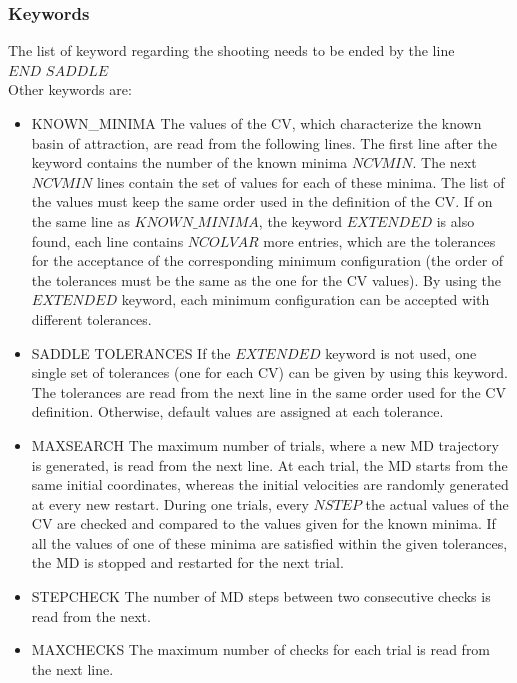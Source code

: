 \documentclass[twoside,10pt,titlepage,a4paper]{article}
\begin{document}
\subsubsection{Keywords}
The list of keyword regarding the shooting needs to be ended by the line \\
$END$ $SADDLE$ \\
Other keywords are:
\begin{itemize}
\item{KNOWN\_MINIMA} The values of the CV, which characterize the
known basin of attraction, are read from the following lines. The
first line after the keyword contains the number of the known
minima $NCVMIN$. The next $NCVMIN$ lines contain the set of
values for each of these minima. The list of the values must
keep the same order used in the definition of the CV.
If on the same line as $KNOWN\_MINIMA$, the keyword $EXTENDED$ is
also found, each line contains $NCOLVAR$ more entries, which are
the tolerances for the acceptance  of the corresponding minimum
configuration  (the order of the tolerances must be the same as
the one for the CV values). By using the $EXTENDED$ keyword,
each minimum configuration can be accepted with different tolerances.
\item{SADDLE TOLERANCES} If the $EXTENDED$ keyword is not used, one
single set of tolerances (one for each CV) can be given by using
this keyword. The tolerances are read from the next line in the
same order used for the CV definition.
Otherwise, default values are assigned at each tolerance.
\item{MAXSEARCH} The maximum number of trials, where a new MD trajectory
is generated, is read from the next line. At each trial, the MD starts
from the same initial coordinates, whereas the initial velocities are
randomly generated at every new restart.
During one trials, every $NSTEP$ the actual values of the CV are checked
and compared to the values given for the known minima. If all the
values of one of these minima are satisfied within the given
tolerances, the MD is stopped and restarted for the next trial.
\item{STEPCHECK}  The number of MD steps between two consecutive
checks is read from the next.
\item{MAXCHECKS}  The maximum number of checks for each trial is
read from the next line.
\end{itemize}
\end{document}
